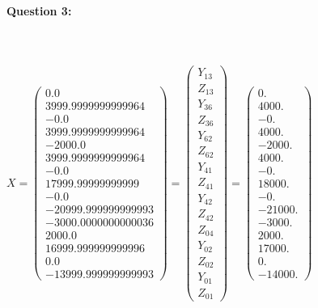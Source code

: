 \paragraph{Question 3:} 
 ~\ \\ ~\ \\
$X=\left(\begin{array}{c}
0.0 \\ 3999.9999999999964 \\ -0.0 \\ 3999.9999999999964 \\  -2000.0 \\ 3999.9999999999964 \\ -0.0 \\ 17999.99999999999 \\ -0.0 \\ -20999.999999999993 \\ -3000.0000000000036 \\ 2000.0 \\  16999.999999999996 \\ 0.0 \\ -13999.999999999993\end{array}\right)=\left(\begin{array}{c}
Y_{13} \\ Z_{13} \\ Y_{36} \\ Z_{36} \\ Y_{62} \\ Z_{62} \\
Y_{41} \\ Z_{41} \\ Y_{42} \\ Z_{42} \\ Z_{04} \\ Y_{02} \\
Z_{02} \\ Y_{01} \\ Z_{01}\end{array}\right)=\left(\begin{array}{c}
0. \\ 4000. \\ -0. \\ 4000. \\ -2000. \\ 4000. \\ -0. \\
18000. \\ -0. \\ -21000. \\ -3000. \\ 2000. \\ 17000. \\ 0. \\ -14000.\end{array}\right)$


